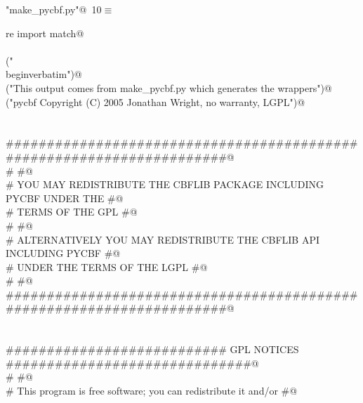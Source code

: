 \documentclass[10pt,a4paper,twoside,notitlepage]{article}
\begin{document}
\begin{flushleft} \small\label{scrap8}\raggedright\small
{} \verb@"make_pycbf.py"@\nobreak\ {\footnotesize {10}}$\equiv$
\vspace{-1ex}
\begin{list}{}{} \item
\mbox{}\verb@from re import match@\\
\mbox{}\verb@@\\
\mbox{}\verb@print("\\begin{verbatim}")@\\
\mbox{}\verb@print("This output comes from make_pycbf.py which generates the wrappers")@\\
\mbox{}\verb@print("pycbf Copyright (C) 2005  Jonathan Wright, no warranty, LGPL")@\\
\mbox{}\verb@@\\
\mbox{}\verb@@\\
\mbox{}\verb@######################################################################@\\
\mbox{}\verb@#                                                                    #@\\
\mbox{}\verb@# YOU MAY REDISTRIBUTE THE CBFLIB PACKAGE INCLUDING PYCBF UNDER THE  #@\\
\mbox{}\verb@# TERMS OF THE GPL                                                   #@\\
\mbox{}\verb@#                                                                    #@\\
\mbox{}\verb@# ALTERNATIVELY YOU MAY REDISTRIBUTE THE CBFLIB API INCLUDING PYCBF  #@\\
\mbox{}\verb@# UNDER THE TERMS OF THE LGPL                                        #@\\
\mbox{}\verb@#                                                                    #@\\
\mbox{}\verb@######################################################################@\\
\mbox{}\verb@@\\
\mbox{}\verb@@\\
\mbox{}\verb@########################### GPL NOTICES ##############################@\\
\mbox{}\verb@#                                                                    #@\\
\mbox{}\verb@# This program is free software; you can redistribute it and/or      #@\\

\end{list}
\end{flushleft}
\end{document}
